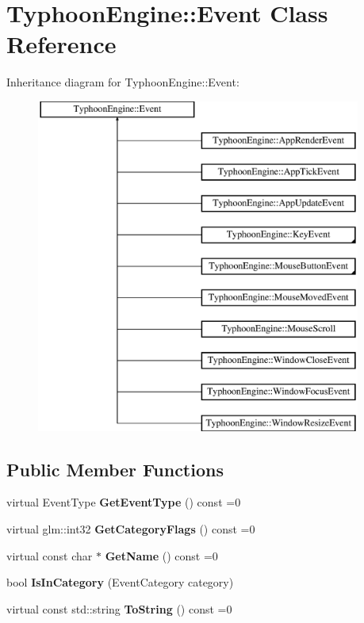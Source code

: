 \hypertarget{class_typhoon_engine_1_1_event}{}\section{Typhoon\+Engine\+::Event Class Reference}
\label{class_typhoon_engine_1_1_event}
Inheritance diagram for Typhoon\+Engine\+::Event\+:\begin{figure}[H]
\begin{center}
\leavevmode
\includegraphics[height=11.000000cm]{class_typhoon_engine_1_1_event}
\end{center}
\end{figure}
\subsection*{Public Member Functions}
\begin{DoxyCompactItemize}
\item 
\mbox{\label{class_typhoon_engine_1_1_event_a0d4693ad803b4551a346bb9492b9ce76}} 
virtual Event\+Type {\bfseries Get\+Event\+Type} () const =0
\item 
\mbox{\label{class_typhoon_engine_1_1_event_acd050c2fe127696a396b66a639010de2}} 
virtual glm\+::int32 {\bfseries Get\+Category\+Flags} () const =0
\item 
\mbox{\label{class_typhoon_engine_1_1_event_a5e63ab5732f09ba055efa8a686938a8d}} 
virtual const char $\ast$ {\bfseries Get\+Name} () const =0
\item 
\mbox{\label{class_typhoon_engine_1_1_event_aa718948dfcf4b35780a7d0e18f2c161a}} 
bool {\bfseries Is\+In\+Category} (Event\+Category category)
\item 
\mbox{\label{class_typhoon_engine_1_1_event_a55d6e4564ccfc9188c0967e2af436e5d}} 
virtual const std\+::string {\bfseries To\+String} () const =0
\end{DoxyCompactItemize}
